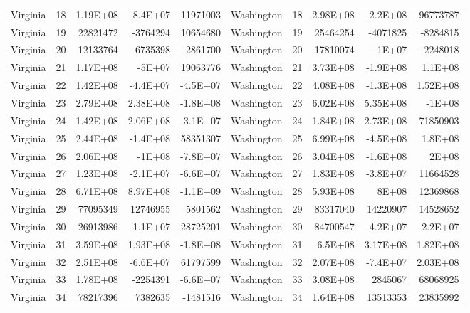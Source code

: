 \begin{table}[]
\begin{tabular}{lrrrrlrrrr}
		Virginia &  18 & 1.19E+08 & -8.4E+07 & 11971003 & Washington &  18 & 2.98E+08 & -2.2E+08 & 96773787 \\
		Virginia &  19 & 22821472 & -3764294 & 10654680 & Washington &  19 & 25464254 & -4071825 & -8284815 \\
		Virginia &  20 & 12133764 & -6735398 & -2861700 & Washington &  20 & 17810074 & -1E+07 & -2248018 \\
		Virginia &  21 & 1.17E+08 & -5E+07 & 19063776 & Washington &  21 & 3.73E+08 & -1.9E+08 & 1.1E+08 \\
		Virginia &  22 & 1.42E+08 & -4.4E+07 & -4.5E+07 & Washington &  22 & 4.08E+08 & -1.3E+08 & 1.52E+08 \\
		Virginia &  23 & 2.79E+08 & 2.38E+08 & -1.8E+08 & Washington &  23 & 6.02E+08 & 5.35E+08 & -1E+08 \\
		Virginia &  24 & 1.42E+08 & 2.06E+08 & -3.1E+07 & Washington &  24 & 1.84E+08 & 2.73E+08 & 71850903 \\
		Virginia &  25 & 2.44E+08 & -1.4E+08 & 58351307 & Washington &  25 & 6.99E+08 & -4.5E+08 & 1.8E+08 \\
		Virginia &  26 & 2.06E+08 & -1E+08 & -7.8E+07 & Washington &  26 & 3.04E+08 & -1.6E+08 & 2E+08 \\
		Virginia &  27 & 1.23E+08 & -2.1E+07 & -6.6E+07 & Washington &  27 & 1.83E+08 & -3.8E+07 & 11664528 \\
		Virginia &  28 & 6.71E+08 & 8.97E+08 & -1.1E+09 & Washington &  28 & 5.93E+08 & 8E+08 & 12369868 \\
		Virginia &  29 & 77095349 & 12746955 & 5801562 & Washington &  29 & 83317040 & 14220907 & 14528652 \\
		Virginia &  30 & 26913986 & -1.1E+07 & 28725201 & Washington &  30 & 84700547 & -4.2E+07 & -2.2E+07 \\
		Virginia &  31 & 3.59E+08 & 1.93E+08 & -1.8E+08 & Washington &  31 & 6.5E+08 & 3.17E+08 & 1.82E+08 \\
		Virginia &  32 & 2.51E+08 & -6.6E+07 & 61797599 & Washington &  32 & 2.07E+08 & -7.4E+07 & 2.03E+08 \\
		Virginia &  33 & 1.78E+08 & -2254391 & -6.6E+07 & Washington &  33 & 3.08E+08 & 2845067 & 68068925 \\
		Virginia &  34 & 78217396 & 7382635 & -1481516 & Washington &  34 & 1.64E+08 & 13513353 & 23835992
	\end{tabular}
\end{table}

